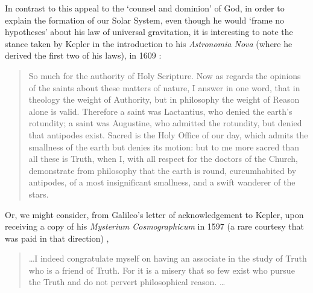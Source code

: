 In contrast to this appeal to the `counsel and dominion' of God, in order to explain the formation of our Solar System, even though he would `frame no hypotheses' about his law of universal gravitation, it is interesting to note the stance taken by Kepler in the introduction to his \textit{Astronomia Nova} (where he derived the first two of his laws), in 1609 \cite{Koestler1959}:
\begin{quotation}
So much for the authority of Holy Scripture. Now as regards the opinions of the saints about these matters of nature, I answer in one word, that in theology the weight of Authority, but in philosophy the weight of Reason alone is valid. Therefore a saint was Lactantius, who denied the earth's rotundity; a saint was Augustine, who admitted the rotundity, but denied that antipodes exist. Sacred is the Holy Office of our day, which admits the smallness of the earth but denies its motion: but to me more sacred than all these is Truth, when I, with all respect for the doctors of the Church, demonstrate from philosophy that the earth is round, curcumhabited by antipodes, of a most insignificant smallness, and a swift wanderer of the stars.
\end{quotation}
Or, we might consider, from Galileo's letter of acknowledgement to Kepler, upon receiving a copy of his \textit{Mysterium Cosmographicum} in 1597 (a rare courtesy that was paid in that direction) \cite{Koestler1959},
\begin{quotation}
\ldots I indeed congratulate myself on having an associate in the study of Truth who is a friend of Truth. For it is a misery that so few exist who pursue the Truth and do not pervert philosophical reason. \ldots
\end{quotation}


